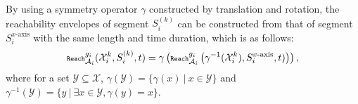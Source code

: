 \documentclass[letterpaper]{article} %
\theoremstyle{definition}
\newtheorem{definition}{Definition}
\newtheorem{theorem}{Theorem}
\newcommand{\reals}{\mathbb{R}}
\newcommand{\nnreals}{\reals^{\ge 0}}
\begin{document}




By using a symmetry operator $\gamma$ constructed by translation and rotation, the reachability envelopes of segment $ S_i^{(k)}$ can be constructed from that of segment  $S^{x\text{-axis}}_i$ with the same length and time duration, which is as follows:
\begin{equation*}\scriptsize
    \texttt{Reach}_{\mathcal{A}_i}^{g_i}(\mathcal{X}^k_i, S_i^{(k)},t) = 
    \gamma\left(  \texttt{Reach}_{\mathcal{A}_i}^{g_i} \left(\gamma^{-1}(\mathcal{X}^k_i), S^{x\text{-axis}}_i, t)\right)  \right),
\end{equation*}
where for a set $\mathcal{Y}\subseteq \mathcal{X}$,  $\gamma(\mathcal{Y}) = \{\gamma(x) \ | \ x \in \mathcal{Y}\}$ and $\gamma^{-1}(\mathcal{Y}) = \{ y \ |\ \exists x \in \mathcal{Y}, \gamma(y) = x\}$. 
\end{document}
